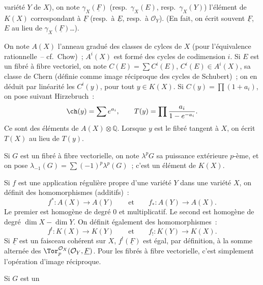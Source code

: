 variété \(Y\) de \(X\)), on note \(\gamma_X(\underline F)\) (resp.\ \(\gamma_X(E)\), resp.\ \(\gamma_X(Y)\)) l'élément de \(K(X)\) correspondant à \(\underline F\) (resp.\ à \(\underline E\), resp.\ à \(\mathcal O_Y\)). (En fait, on écrit souvent \(\underline F\), \(E\) au lieu de \(\gamma_X(\underline F)\)\dots).

On note \(A(X)\) l'anneau gradué des classes de cylces de \(X\) (pour l'équivalence rationnelle~-- cf.\ Chow)~; \(A^i(X)\) est formé des cycles de codimension \(i\). Si \(E\) est un fibré à fibre vectoriel, on note \(C(E)=\sum C^i(E)\), \(C^i(E)\in A^i(X)\), sa classe de Chern (définie comme image réciproque des cycles de Schubert)~; on en déduit par linéarité les \(C^i(y)\), pour tout \(y\in K(X)\). Si \(C(y)=\prod(1+a_i)\), on pose suivant Hirzebruch~:
\[
  \ch(y)=\sum e^{a_i},\qquad
  T(y)=\prod\frac{a_i}{1-e^{-a_i}}.
\]
Ce sont des éléments de \(A(X)\otimes\mathbb Q\). Lorsque \(y\) est le fibré tangent à \(X\), on écrit \(T(X)\) au lieu de \(T(y)\).

Si \(G\) est un fibré à fibre vectorielle, on note \(\lambda^pG\) sa puissance extérieure \(p\)-ème, et on pose \(\lambda_{-1}(G)=\sum(-1)^p\lambda^p(G)\)~; c'est un élément de \(K(X)\).

Si \(f\) est une application régulière propre d'une variété \(Y\) dans une variété \(X\), on définit des homomorphismes (additifs)~:
\[
  f^*:A(X)\longrightarrow A(Y)\qquad\text{et}\qquad
  f_*:A(Y)\longrightarrow A(X).
\]
Le premier est homogène de degré \(0\) et multiplicatif. Le second est homogène de degré \(\dim X-\dim Y\). On définit également des homomorphismes~:
\[
  f^!:K(X)\longrightarrow K(Y)\qquad\text{et}\qquad
  f_!:K(Y)\longrightarrow K(X).
\]
Si \(\underline F\) est un faisceau cohérent sur \(X\), \(f^!(\underline F)\) est égal, par définition, à la somme alternée des \(\Tor_p^{\mathcal O_X}(\mathcal O_Y,\underline F)\). Pour les fibrés à fibre vectorielle, c'est simplement l'opération d'image réciproque.

Si \(G\) est un
